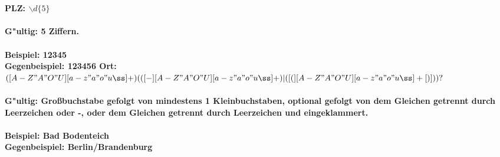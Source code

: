 \documentclass{article}
\begin{document}
\\
\\
\bf{PLZ: }\normalfont $\backslash d\lbrace5\rbrace$\\
\\
G"ultig: 5 Ziffern.\\
\\
Beispiel: 12345\\
Gegenbeispiel: 123456
\newpage
\noindent
\bf{Ort: }\normalfont $([A-Z"A"O"U][a-z"a"o"uß]+)(([- ][A-Z"A"O"U][a-z"a"o"uß]+)|( [(][A-Z"A"O"U][a-z"a"o"uß]+[)]))?$\\
\\
G"ultig: Großbuchstabe gefolgt von mindestens 1 Kleinbuchstaben, optional gefolgt von dem Gleichen getrennt durch Leerzeichen oder -, oder dem Gleichen getrennt durch Leerzeichen und eingeklammert.\\
\\
Beispiel: Bad Bodenteich\\
Gegenbeispiel: Berlin/Brandenburg\\
\\
\\
\end{document}
